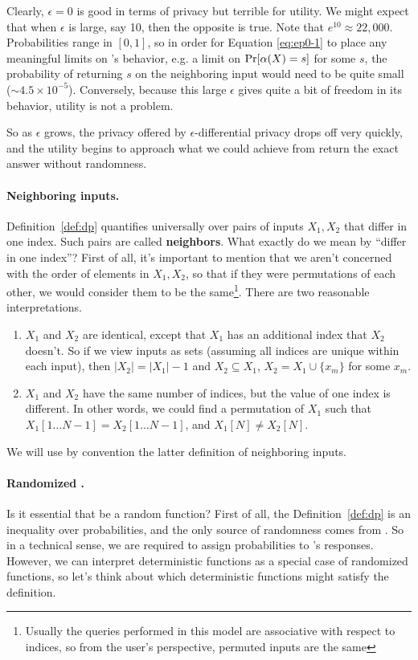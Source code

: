 \documentclass[11pt,twoside]{scrartcl}
\begin{document}
Clearly, $\epsilon=0$ is good in terms of privacy but terrible for utility. We might expect that when $\epsilon$ is large, say 10, then the opposite is true. Note that $e^{10} \approx 22,000$. Probabilities range in $[0,1]$, so in order for Equation \ref{eq:ep0-1} to place any meaningful limits on \san's behavior, e.g. a limit on $\mathrm{Pr}[\alpha(X) = s]$ for some $s$, the probability of returning $s$ on the neighboring input would need to be quite small ($\sim 4.5 \times 10^{-5}$). Conversely, because this large $\epsilon$ gives \san quite a bit of freedom in its behavior, utility is not a problem.

So as $\epsilon$ grows, the privacy offered by $\epsilon$-differential privacy drops off very quickly, and the utility begins to approach what we could achieve from return the exact answer without randomness.

\paragraph{Neighboring inputs.} Definition~\ref{def:dp} quantifies universally over pairs of inputs $X_1, X_2$ that differ in one index. Such pairs are called \textbf{neighbors}. What exactly do we mean by ``differ in one index''? First of all, it's important to mention that we aren't concerned with the order of elements in $X_1, X_2$, so that if they were permutations of each other, we would consider them to be the same\footnote{Usually the queries performed in this model are associative with respect to indices, so from the user's perspective, permuted inputs are the same}. There are two reasonable interpretations.
\begin{enumerate}
\item $X_1$ and $X_2$ are identical, except that $X_1$ has an additional index that $X_2$ doesn't. So if we view inputs as sets (assuming all indices are unique within each input), then $|X_2| = |X_1| - 1$ and $X_2 \subseteq X_1$, $X_2 = X_1 \cup \{x_m\}$ for some $x_m$.

\item $X_1$ and $X_2$ have the same number of indices, but the value of one index is different. In other words, we could find a permutation of $X_1$ such that $X_1[1\ldots N-1] = X_2[1\ldots N-1]$, and $X_1[N] \ne X_2[N]$.
\end{enumerate}
We will use by convention the latter definition of neighboring inputs. 

\paragraph{Randomized \san.} Is it essential that \san be a random function? First of all, the Definition~\ref{def:dp} is an inequality over probabilities, and the only source of randomness comes from \san. So in a technical sense, we are required to assign probabilities to \san's responses. However, we can interpret deterministic functions as a special case of randomized functions, so let's think about which deterministic functions might satisfy the definition.
\end{document}
